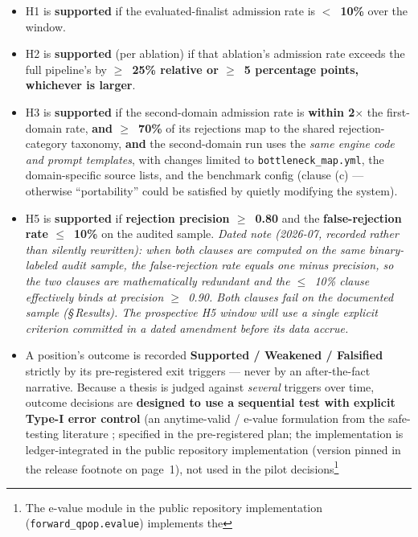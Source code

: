 \documentclass[11pt]{article}
\begin{document}
\begin{itemize}
  \item H1 is \textbf{supported} if the evaluated-finalist admission rate is \textbf{$<$~10\%}
    over the window.
  \item H2 is \textbf{supported} (per ablation) if that ablation's admission rate exceeds the
    full pipeline's by \textbf{$\geq$~25\% relative or $\geq$~5 percentage points, whichever is
    larger}.
  \item H3 is \textbf{supported} if the second-domain admission rate is \textbf{within
    2$\times$} the first-domain rate, \textbf{and $\geq$~70\%} of its rejections map to the shared
    rejection-category taxonomy, \textbf{and} the second-domain run uses the \emph{same engine code
    and prompt templates}, with changes limited to \texttt{bottleneck\_map.yml}, the domain-specific
    source lists, and the benchmark config (clause (c) --- otherwise ``portability'' could be
    satisfied by quietly modifying the system).
  \item H5 is \textbf{supported} if \textbf{rejection precision $\geq$~0.80} and the
    \textbf{false-rejection rate $\leq$~10\%} on the audited sample. \emph{Dated note
    (2026-07, recorded rather than silently rewritten): when both clauses are computed on the same
    binary-labeled audit sample, the false-rejection rate equals one minus precision, so the two
    clauses are mathematically redundant and the $\leq$~10\% clause effectively binds at precision
    $\geq$~0.90. Both clauses fail on the documented sample (\S\,Results). The prospective H5 window
    will use a single explicit criterion committed in a dated amendment before its data accrue.}
  \item A position's outcome is recorded \textbf{Supported / Weakened / Falsified} strictly by
    its pre-registered exit triggers --- never by an after-the-fact narrative. Because a thesis is
    judged against \emph{several} triggers over time, outcome decisions are \textbf{designed to use
    a sequential test with explicit Type-I error control} (an anytime-valid / e-value formulation
    from the
    safe-testing literature \citep{ramdas2023gametheoretic,shafer2021testing,vovk2021evalues};
    specified in the pre-registered plan; the implementation is
    ledger-integrated in the public repository implementation (version pinned in the
    release footnote on page~1), not used in the pilot decisions\footnote{The
    e-value module in the public repository implementation
    (\texttt{forward\_qpop.evalue}) implements the
}
\end{itemize}
\end{document}
